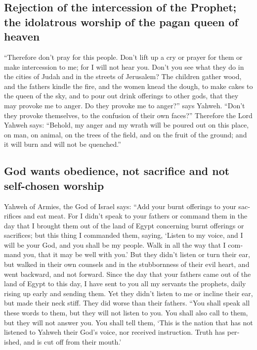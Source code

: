 \begin{paracol}{2}
\begin{otherlanguage}{english}
\hypertarget{rejection-of-the-intercession-of-the-prophet-the-idolatrous-worship-of-the-pagan-queen-of-heaven}{%
\subsection{Rejection of the intercession of the Prophet; the idolatrous
worship of the pagan queen of
heaven}\label{rejection-of-the-intercession-of-the-prophet-the-idolatrous-worship-of-the-pagan-queen-of-heaven}}

 ``Therefore don't pray for this people. Don't lift up a
cry or prayer for them or make intercession to me; for I will not hear
you.  Don't you see what they do in the cities of Judah
and in the streets of Jerusalem?  The children gather
wood, and the fathers kindle the fire, and the women knead the dough, to
make cakes to the queen of the sky, and to pour out drink offerings to
other gods, that they may provoke me to anger.  Do they
provoke me to anger?'' says Yahweh. ``Don't they provoke themselves, to
the confusion of their own faces?''  Therefore the Lord
Yahweh says: ``Behold, my anger and my wrath will be poured out on this
place, on man, on animal, on the trees of the field, and on the fruit of
the ground; and it will burn and will not be quenched.''

\hypertarget{god-wants-obedience-not-sacrifice-and-not-self-chosen-worship}{%
\subsection{God wants obedience, not sacrifice and not self-chosen
worship}\label{god-wants-obedience-not-sacrifice-and-not-self-chosen-worship}}

 Yahweh of Armies, the God of Israel says: ``Add your
burnt offerings to your sacrifices and eat meat.  For I
didn't speak to your fathers or command them in the day that I brought
them out of the land of Egypt concerning burnt offerings or sacrifices;
 but this thing I commanded them, saying, `Listen to my
voice, and I will be your God, and you shall be my people. Walk in all
the way that I command you, that it may be well with you.'
 But they didn't listen or turn their ear, but walked in
their own counsels and in the stubbornness of their evil heart, and went
backward, and not forward.  Since the day that your
fathers came out of the land of Egypt to this day, I have sent to you
all my servants the prophets, daily rising up early and sending them.
 Yet they didn't listen to me or incline their ear, but
made their neck stiff. They did worse than their fathers.
 ``You shall speak all these words to them, but they will
not listen to you. You shall also call to them, but they will not answer
you.  You shall tell them, `This is the nation that has
not listened to Yahweh their God's voice, nor received instruction.
Truth has perished, and is cut off from their mouth.'


\end{otherlanguage}
\end{paracol}
